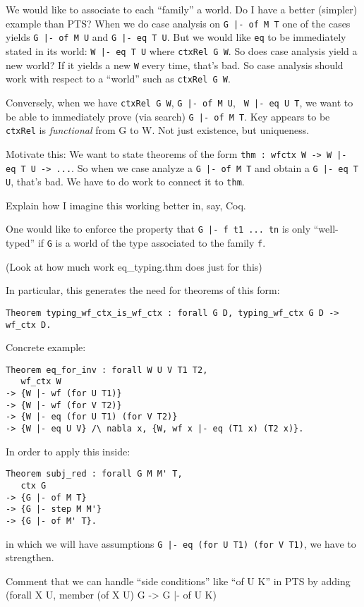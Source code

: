 \documentclass{article}
\begin{document}
We would like to associate to each ``family'' a world.
Do I have a better (simpler) example than PTS?
When we do case analysis on {\tt {G |- of M T}} one of the cases yields
{\tt {G |- of M U}} and {\tt {G |- eq T U}}. But we would like {\tt eq}
  to be immediately stated in its world: {\tt {W |- eq T U}} where
  {\tt ctxRel G W}. So does case analysis yield a new world? If it
  yields a new {\tt W} every time, that's bad. So case analysis should
  work with respect to a ``world'' such as {\tt ctxRel G W}.

Conversely, when we have {\tt ctxRel G W}, {\tt {G |- of M U}}, {\tt
  {W |- eq U T}}, we want to be able to immediately prove (via search)
{\tt {G |- of M T}}. Key appears to be {\tt ctxRel} is
\emph{functional} from G to W. Not just existence, but uniqueness.

Motivate this: We want to state theorems of the form {\tt thm : wfctx W ->
  {W |- eq T U} -> ...}. So when we case analyze a {\tt {G |- of M T}}
and obtain a {\tt {G |- eq T U}}, that's bad. We have to do work to
connect it to {\tt thm}.

Explain how I imagine this working better in, say, Coq.

One would like to enforce the property that {\tt {G |- f t1 ... tn}} is
only ``well-typed'' if {\tt G} is a world of the type associated to
the family {\tt f}. 

(Look at how much work eq\_typing.thm does just for this)

In particular, this generates the need for theorems of this form:

\begin{verbatim}
Theorem typing_wf_ctx_is_wf_ctx : forall G D, typing_wf_ctx G D -> wf_ctx D.
\end{verbatim}

Concrete example: 
\begin{verbatim}
Theorem eq_for_inv : forall W U V T1 T2,
   wf_ctx W
-> {W |- wf (for U T1)}
-> {W |- wf (for V T2)}
-> {W |- eq (for U T1) (for V T2)}
-> {W |- eq U V} /\ nabla x, {W, wf x |- eq (T1 x) (T2 x)}.
\end{verbatim}

In order to apply this inside:

\begin{verbatim}
Theorem subj_red : forall G M M' T,
   ctx G
-> {G |- of M T}
-> {G |- step M M'}
-> {G |- of M' T}.
\end{verbatim}

in which we will have assumptions
{\tt {G |- eq (for U T1) (for V T1)}}, we have to strengthen.

Comment that we can handle ``side conditions'' like ``of U K'' in PTS
by adding (forall X U, member (of X U) G -> {G |- of U K}) 
\end{document}
